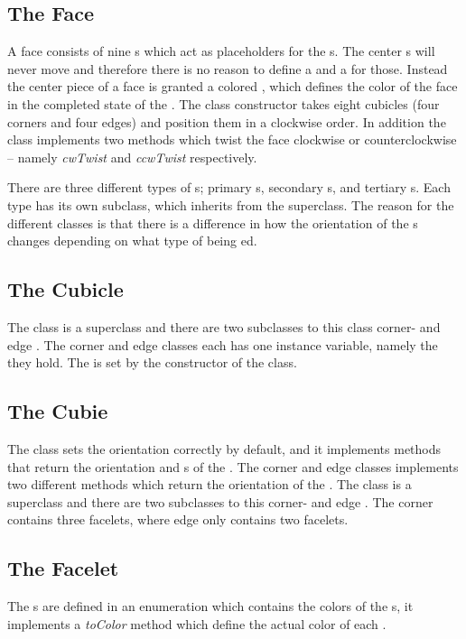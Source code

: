 \subsection{The Face}
A face consists of nine \cubicle{}s which act as placeholders for the \cpiece{}s. The center \cpiece{}s will never move and therefore there is no reason to define a \cubicle{} and a \cpiece{} for those. Instead the center piece of a face is granted a colored \facelet{}, which defines the color of the face in the completed state of the \rubik{}.
The \face{} class constructor takes eight cubicles (four corners and four edges) and position them in a clockwise order. In addition the \face{} class implements two methods which twist the face clockwise or counterclockwise -- namely \textit{cwTwist} and \textit{ccwTwist} respectively.

There are three different types of \face{}s; primary \face{}s, secondary \face{}s, and tertiary \face{}s.
Each type has its own subclass, which inherits from the \face{} superclass.
The reason for the different classes is that there is a difference in how the orientation of the \cubie{}s changes depending on what type of \face{} being \twist{}ed.

\subsection{The Cubicle}
The \cubicle{} class is a superclass and there are two subclasses to this class corner- and edge \cubicle{}.
The corner and edge \cubicle{} classes each has one instance variable, namely the \cubie{} they hold. The \cpiece{} is set by the constructor of the \cubicle{} class.

\subsection{The Cubie}
The \cpiece{} class sets the orientation correctly by default, and it implements methods that return the orientation and \facelet{}s of the \cpiece{}. The corner and edge \cpiece{} classes implements two different methods which return the orientation of the \cpiece{}. The \cubie{} class is a superclass and there are two subclasses to this corner- and edge \cubie{}. The corner \cubie{} contains three facelets, where edge \cubie{} only contains two facelets.

\subsection{The Facelet}
The \facelet{}s are defined in an enumeration which contains the colors of the \facelet{}s, it implements a \textit{toColor} method which define the actual color of each \facelet{}.
